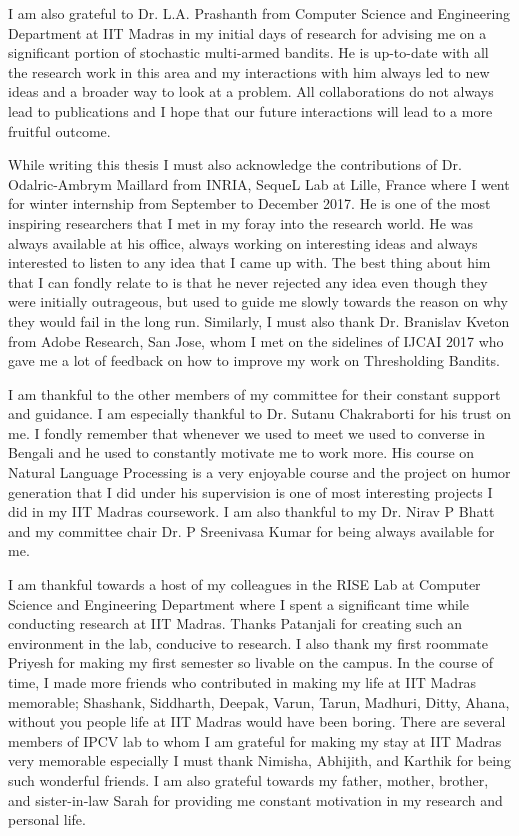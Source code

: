 I am also grateful to Dr. L.A. Prashanth from Computer Science and Engineering Department at IIT Madras in my initial days of research for advising me on a significant portion of stochastic multi-armed bandits. He is up-to-date with all the research work in this area and my interactions with him always led to new ideas and a broader way to look at a problem. All collaborations do not always lead to publications and I hope that our future interactions will lead to a more fruitful outcome.

While writing this thesis I must also acknowledge the contributions of Dr. Odalric-Ambrym Maillard from INRIA, SequeL Lab at Lille, France where I went for winter internship from September to December 2017. He is one of the most inspiring researchers that I met in my foray into the research world. He was always available at his office, always working on interesting ideas and always interested to listen to any idea that I came up with. The best thing about him that I can fondly relate to is that he never rejected any idea even though they were initially outrageous, but used to guide me slowly towards the reason on why they would fail in the long run. Similarly, I must also thank Dr. Branislav Kveton from Adobe Research, San Jose, whom I met on the sidelines of IJCAI 2017 who gave me a lot of feedback on how to improve my work on Thresholding Bandits. 

I am thankful to the other members of my committee for their constant support and guidance. I am especially thankful to Dr.  Sutanu Chakraborti for his trust on me. I fondly remember that whenever we used to meet we used to converse in Bengali and he used to constantly motivate me to work more. His course on Natural Language Processing is a very enjoyable course and the project on humor generation that I did under his supervision is one of most interesting projects I did in my IIT Madras coursework. I am also thankful to my Dr. Nirav P Bhatt and my committee chair Dr. P Sreenivasa Kumar for being always available for me.


I am thankful towards a host of my colleagues in the RISE Lab at Computer Science and Engineering Department where I spent a significant time while conducting research at IIT Madras. Thanks Patanjali for creating such an environment in the lab, conducive to research. I also thank my first roommate Priyesh for making my first semester so livable on the campus. In the course of time, I made more friends who contributed in making my life at IIT Madras memorable; Shashank, Siddharth, Deepak, Varun, Tarun, Madhuri, Ditty, Ahana, without you people life at IIT Madras would have been boring. There are several members of IPCV lab to whom I am grateful for making my stay at IIT Madras very memorable especially I must thank Nimisha, Abhijith, and Karthik for being such wonderful friends. I am also grateful towards my father, mother, brother, and sister-in-law Sarah for providing me constant motivation in my research and personal life. 

